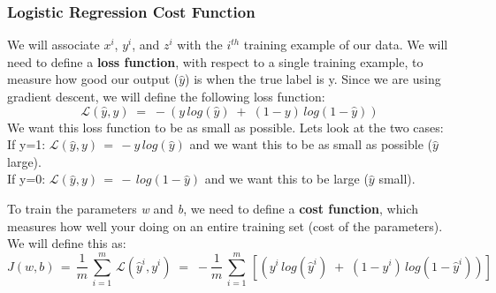 \documentclass[11pt, a4paper]{article}
\begin{document}
\begin{spacing}{1.1}
	\subsubsection{Logistic Regression Cost Function}
	We will associate $x^i$, $y^i$, and $z^i$ with the $i^{th}$ training example of our data. We will need to define a \textbf{loss function}, with respect to a single training example, to measure how good our output ($\hat{y}$) is when the true label is y. Since we are using gradient descent, we will define the following loss function: $$ \mathcal{L}(\hat{y},y) \; = \; -(y\,log(\hat{y}) \; + \; (1-y)\,log(1-\hat{y}))  $$ We want this loss function to be as small as possible. Lets look at the two cases: \vspace*{1mm} \\
	\hspace*{2mm} If y=1: $ \mathcal{L}(\hat{y},y) \, = \, -y\,log(\hat{y})$ and we want this to be as small as possible ($\hat{y}$ large). \\
	\hspace*{2mm} If y=0: $ \mathcal{L}(\hat{y},y) \, = \, -\,log(1-\hat{y})$ and we want this to be large ($\hat{y}$ small). \newpage

	\noindent To train the parameters \textit{w} and \textit{b}, we need to define a \textbf{cost function}, which measures how well your doing on an entire training set (cost of the parameters). We will define this as: \\ $$ J(w,b)\, = \, \frac{1}{m}\, \sum_{i=1}^{m}\, \mathcal{L}(\hat{y}^i,y^i) \; = \; -\frac{1}{m}\, \sum_{i=1}^{m}\, [(y^i\,log(\hat{y}^i) \; + \; (1-y^i)\,log(1-\hat{y}^i))] $$

\end{spacing}
\end{document}
